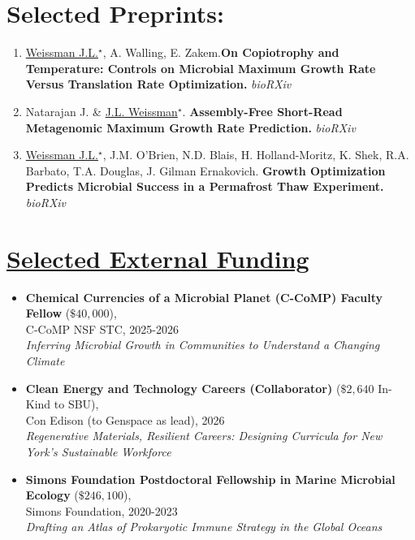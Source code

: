 \documentclass[]{res}
\begin{document}
\begin{resume}
 \section{Selected Preprints:} \vspace{0mm}
  
 \begin{enumerate}[leftmargin=*]
 \setlength\itemsep{0.25em}

\item \underline{Weissman J.L.$^\star$},  A. Walling, E. Zakem.{\bf  On Copiotrophy and Temperature: Controls on Microbial Maximum Growth Rate Versus Translation Rate Optimization.}  \emph{bioRXiv} 

\item Natarajan J. \& \underline{J.L. Weissman$^\star$}. {\bf Assembly-Free Short-Read Metagenomic Maximum Growth Rate Prediction.} \emph{bioRXiv} 
 
\item \underline{Weissman J.L.$^\star$}, J.M. O'Brien, N.D. Blais, H. Holland-Moritz, K. Shek, R.A. Barbato, T.A. Douglas, J. Gilman Ernakovich. {\bf Growth Optimization Predicts Microbial Success in a Permafrost Thaw Experiment.} \emph{bioRXiv}
 

\end{enumerate} 


  \section{\underline{Selected External Funding}} %
\begin{itemize} 
\item[] {\bf Chemical Currencies of a Microbial Planet (C-CoMP) Faculty Fellow} ($\$40,000$),\\ C-CoMP NSF STC, 2025-2026\\\emph{Inferring Microbial Growth in Communities to Understand a Changing Climate}\\
\item[] {\bf Clean Energy and Technology Careers (Collaborator)} ($\$2,640$ In-Kind to SBU),\\Con Edison (to Genspace as lead), 2026\\\emph{Regenerative Materials, Resilient Careers: Designing Curricula for New York’s Sustainable Workforce}\\
\item[] {\bf Simons Foundation Postdoctoral Fellowship in Marine Microbial Ecology} ($\$246,100$),\\ Simons Foundation, 2020-2023\\\emph{Drafting an Atlas of Prokaryotic Immune Strategy in the Global Oceans}
\end{itemize} 



\end{resume} 
\end{document}
